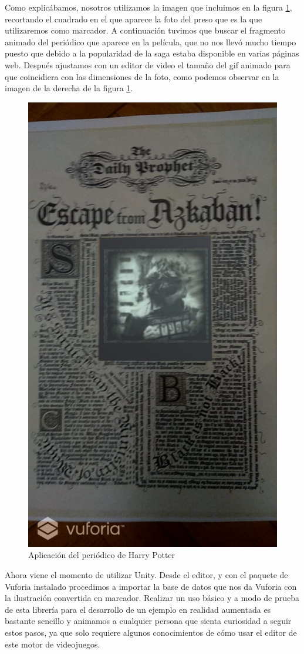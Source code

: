 Como explicábamos, nosotros utilizamos la imagen que incluimos en la figura \ref{Azkaban}, recortando el cuadrado en el que aparece la foto del preso que es la que utilizaremos como marcador. A continuación tuvimos que buscar el fragmento animado del periódico que aparece en la película, que no nos llevó mucho tiempo puesto que debido a la popularidad de la saga estaba disponible en varias páginas web. Después ajustamos con un editor de video el tamaño del gif animado para que coincidiera con las dimensiones de la foto, como podemos observar en la imagen de la derecha de la figura \ref{Azkaban}.\\

\begin{figure}[H]
    \centering
    \includegraphics[width=0.4\linewidth]{Images/Azkaban.jpeg}
    \caption{Aplicación del periódico de Harry Potter}
    \label{Azkaban}
\end{figure}

Ahora viene el momento de utilizar Unity. Desde el editor, y con el paquete de Vuforia instalado procedimos a importar la base de datos que nos da Vuforia con la ilustración convertida en marcador. Realizar un uso básico y a modo de prueba de esta librería para el desarrollo de un ejemplo en realidad aumentada es bastante sencillo y animamos a cualquier persona que sienta curiosidad a seguir estos pasos, ya que solo requiere algunos conocimientos de cómo usar el editor de este motor de videojuegos.\\

